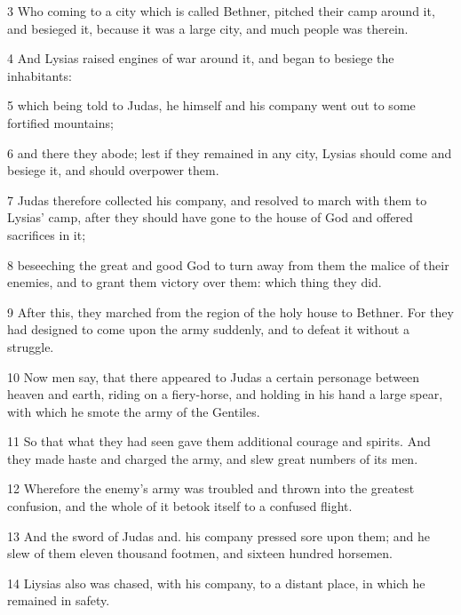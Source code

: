 \par 3 Who coming to a city which is called Bethner, pitched their camp around it, and besieged it, because it was a large city, and much people was therein. 

\par 4 And Lysias raised engines of war around it, and began to besiege the inhabitants: 

\par 5 which being told to Judas, he himself and his company went out to some fortified mountains; 

\par 6 and there they abode; lest if they remained in any city, Lysias should come and besiege it, and should overpower them. 

\par 7 Judas therefore collected his company, and resolved to march with them to Lysias’ camp, after they should have gone to the house of God and offered sacrifices in it; 

\par 8 beseeching the great and good God to turn away from them the malice of their enemies, and to grant them victory over them: which thing they did. 

\par 9 After this, they marched from the region of the holy house to Bethner. For they had designed to come upon the army suddenly, and to defeat it without a struggle. 

\par 10 Now men say, that there appeared to Judas a certain personage between heaven and earth, riding on a fiery-horse, and holding in his hand a large spear, with which he smote the army of the Gentiles. 

\par 11 So that what they had seen gave them additional courage and spirits. And they made haste and charged the army, and slew great numbers of its men. 

\par 12 Wherefore the enemy’s army was troubled and thrown into the greatest confusion, and the whole of it betook itself to a confused flight. 

\par 13 And the sword of Judas and. his company pressed sore upon them; and he slew of them eleven thousand footmen, and sixteen hundred horsemen. 

\par 14 Liysias also was chased, with his company, to a distant place, in which he remained in safety.

